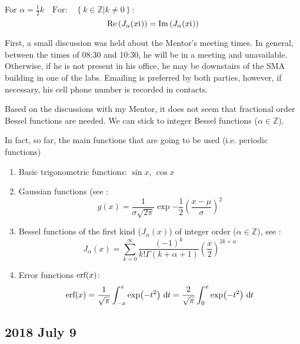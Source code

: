 \documentclass[twocolumn]{article}
\begin{document}
For $\alpha = \frac{1}{2}k \quad \text{For:} \quad \left\{ \left. k \in \mathbb{Z} \right| k \neq 0 \right\}$:
\begin{equation*}
	\text{Re} \left( J_\alpha (x \mathrm{i}\mkern1mu) \right) = \text{Im} \left( J_\alpha (x \mathrm{i}\mkern1mu) \right)
\end{equation*}

\begin{meetingnotes*}
	First, a small discussion was held about the Mentor's meeting times. In general, between the times of 08:30 and 10:30, he will be in a meeting and unavailable. Otherwise, if he is not present in his office, he may be downstairs of the SMA building in one of the labs. Emailing is preferred by both parties, however, if necessary, his cell phone number is recorded in contacts.

	Based on the discussions with my Mentor, it does not seem that fractional order Bessel functions are needed. We can stick to integer Bessel functions ($\alpha \in \mathbb{Z}$). 

	In fact, so far, the main functions that are going to be used (i.e. periodic functions)
	\begin{enumerate}
		\item Basic trigonometric functions: $\sin{x}$, $\cos{x}$
		\item Gaussian functions (see : 
			\begin{equation*}
				g(x) = \frac{1}{\sigma \sqrt{2 \pi}} \exp{ -\frac{1}{2} \left(\frac{x-\mu}{\sigma}\right)^2 }
			\end{equation*}
		\item Bessel functions of the first kind ($J_\alpha(x)$) of integer order ($\alpha \in \mathbb{Z}$), see :
			\begin{equation*}
				J_{\alpha}(x) = \sum_{k=0}^{\infty} \frac{\left(-1\right)^{k}}{k! \Gamma(k+\alpha+1)} \left( \frac{x}{2} \right)^{2k + \alpha}
			\end{equation*}
		\item Error functions $\text{erf} \! \left( x \right)$:
			\begin{equation*}
				\erf{x} = \frac{1}{\sqrt{\pi}} \int_{-x}^{x} \exp{-t^2} \diff{t} = \frac{2}{\sqrt{\pi}} \int_{0}^{x} \exp{-t^2} \diff{t}
				\label{eq:error_function}
			\end{equation*}
	\end{enumerate}
\end{meetingnotes*}


\subsection{2018 July 9}
\label{subsec:2018_July_9}
\end{document}
